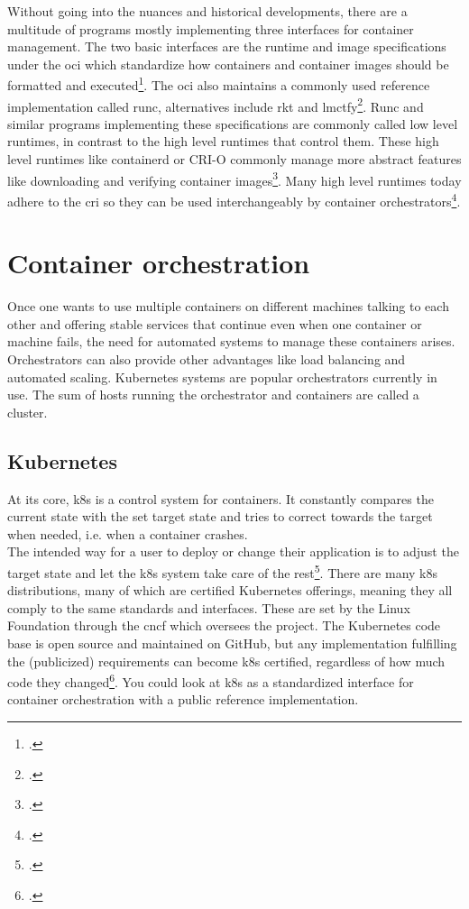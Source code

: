 Without going into the nuances and historical developments, there are a multitude of programs mostly implementing three interfaces for container management.
The two basic interfaces are the runtime and image specifications under the \gls{oci} which standardize how containers and container images should be formatted and executed\footcite[][, first paragraph]{ociStandards}.
The \gls{oci} also maintains a commonly used reference implementation called runc, alternatives include rkt and lmctfy\footcite[][, section 'Examples of Low-Level Container Runtimes']{lowLevelRuntimes}.
Runc and similar programs implementing these specifications are commonly called low level runtimes, in contrast to the high level runtimes that control them.
These high level runtimes like containerd or CRI-O commonly manage more abstract features like downloading and verifying container images\footcite[][, Intro and section 'Examples of High-Level Runtimes']{highLevelRuntimes}.
Many high level runtimes today adhere to the \gls{cri} so they can be used interchangeably by container orchestrators\footcite[][, section 'Purpose']{criGithub}.

\section{Container orchestration}
Once one wants to use multiple containers on different machines talking to each other and offering stable services that continue even when one container or machine fails, the need for automated systems to manage these containers arises. Orchestrators can also provide other advantages like load balancing and automated scaling.
Kubernetes systems are popular orchestrators currently in use.
The sum of hosts running the orchestrator and containers are called a cluster.

\subsection{Kubernetes} \label{k8sTheory}
At its core, \gls{k8s} is a control system for containers.
It constantly compares the current state with the set target state and tries to correct towards the target when needed, i.e. when a container crashes. \\
The intended way for a user to deploy or change their application is to adjust the target state and let the \gls{k8s} system take care of the rest\footcite[][, section 'Understanding Kubernetes Objects']{k8sObjects}.
There are many \gls{k8s} distributions, many of which are certified Kubernetes offerings, meaning they all comply to the same standards and interfaces. These are set by the Linux Foundation through the \gls{cncf} which oversees the project.
The Kubernetes code base is open source and maintained on GitHub, but any implementation fulfilling the (publicized) requirements can become \gls{k8s} certified, regardless of how much code they changed\footcite[][, section 'There are over 80 Certified Kubernetes offerings.']{certifiedK8s}.
You could look at \gls{k8s} as a standardized interface for container orchestration with a public reference implementation.

